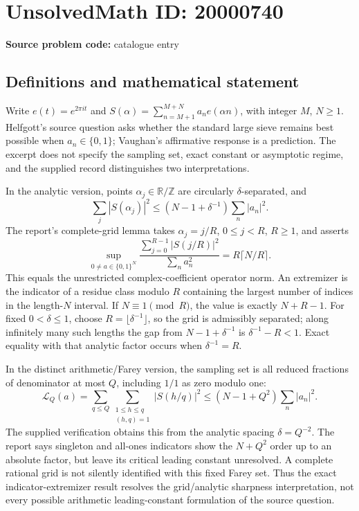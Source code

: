 \documentclass[11pt]{article}
\newcommand{\Z}{\mathbb{Z}}
\newcommand{\R}{\mathbb{R}}
\begin{document}
\section*{UnsolvedMath ID: 20000740}
\textbf{Source problem code:} catalogue entry
\subsection{Definitions and mathematical statement}
Write \(e(t)=e^{2\pi it}\) and \(S(\alpha)=\sum_{n=M+1}^{M+N}a_ne(\alpha n)\), with integer \(M\), \(N\ge1\). Helfgott's source question asks whether the standard large sieve remains best possible when \(a_n\in\{0,1\}\); Vaughan's affirmative response is a prediction. The excerpt does not specify the sampling set, exact constant or asymptotic regime, and the supplied record distinguishes two interpretations.

In the analytic version, points \(\alpha_j\in\R/\Z\) are circularly \(\delta\)-separated, and
\[
 \sum_j|S(\alpha_j)|^2\le(N-1+\delta^{-1})\sum_n|a_n|^2.
\]
The report's complete-grid lemma takes \(\alpha_j=j/R\), \(0\le j<R\), \(R\ge1\), and asserts
\[
 \sup_{0\ne a\in\{0,1\}^N}
 \frac{\sum_{j=0}^{R-1}|S(j/R)|^2}{\sum_n a_n^2}
 =R\lceil N/R\rceil.
\]
This equals the unrestricted complex-coefficient operator norm. An extremizer is the indicator of a residue class modulo \(R\) containing the largest number of indices in the length-\(N\) interval. If \(N\equiv1\pmod R\), the value is exactly \(N+R-1\). For fixed \(0<\delta\le1\), choose \(R=\lfloor\delta^{-1}\rfloor\), so the grid is admissibly separated; along infinitely many such lengths the gap from \(N-1+\delta^{-1}\) is \(\delta^{-1}-R<1\). Exact equality with that analytic factor occurs when \(\delta^{-1}=R\).

In the distinct arithmetic/Farey version, the sampling set is all reduced fractions of denominator at most \(Q\), including \(1/1\) as zero modulo one:
\[
 \mathcal L_Q(a)=\sum_{q\le Q}\sum_{\substack{1\le h\le q\\(h,q)=1}}|S(h/q)|^2
 \le(N-1+Q^2)\sum_n|a_n|^2.
\]
The supplied verification obtains this from the analytic spacing \(\delta=Q^{-2}\). The report says singleton and all-ones indicators show the \(N+Q^2\) order up to an absolute factor, but leave its critical leading constant unresolved. A complete rational grid is not silently identified with this fixed Farey set. Thus the exact indicator-extremizer result resolves the grid/analytic sharpness interpretation, not every possible arithmetic leading-constant formulation of the source question.
\end{document}
